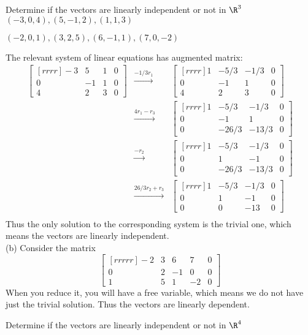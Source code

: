 \ii Determine if the vectors are linearly independent  or not in $\R^3$
\bb
\ii  $(-3,0,4), (5,-1,2), (1,1,3)$

\ii $(-2,0,1), (3,2,5), (6,-1,1), (7,0,-2)$

\ee
\begin{solution}
\noindent The relevant system of linear equations has augmented matrix:
\begin{eqnarray*}
\begin{bmatrix}[rrrr]
-3&5&1&0\\
0&-1&1&0\\
4&2&3&0
\end{bmatrix}
&\xrightarrow[]{-1/3r_1}&
\begin{bmatrix}[rrrr]
1&-5/3&-1/3&0\\
0&-1&1&0\\
4&2&3&0
\end{bmatrix}\\
&\xrightarrow[]{4r_1 - r_3}&
\begin{bmatrix}[rrrr]
1&-5/3&-1/3&0\\
0&-1&1&0\\
0&-26/3&-13/3&0
\end{bmatrix}\\
&\xrightarrow[]{-r_2}&
\begin{bmatrix}[rrrr]
1&-5/3&-1/3&0\\
0&1&-1&0\\
0&-26/3&-13/3&0
\end{bmatrix}\\
&\xrightarrow[]{26/3r_2 +r_3}&
\begin{bmatrix}[rrrr]
1&-5/3&-1/3&0\\
0&1&-1&0\\
0&0&-13&0
\end{bmatrix}\\
\end{eqnarray*}
Thus the only solution to the corresponding system is the trivial one, which means the vectors are linearly independent.
\\
(b) 
Consider the matrix
$$
\begin{bmatrix}[rrrrr]
-2&3&6&7&0\\
0&2&-1&0&0\\
1&5&1&-2&0
\end{bmatrix}
$$
When you reduce it, you will have a free variable, which means we do not have just the trivial solution. Thus the vectors are linearly dependent.
\end{solution}
\ii Determine if the vectors are linearly independent  or not in $\R^4$
